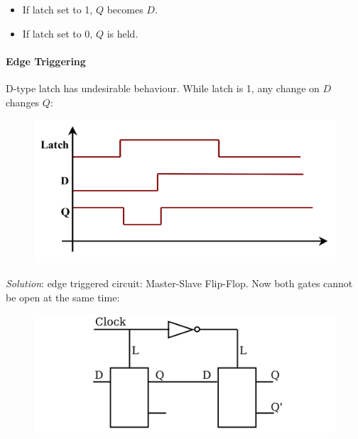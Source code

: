 \documentclass[twocolumn,english]{article}
\begin{document}
\begin{itemize}
\item If latch set to 1, $Q$ becomes $D$.
\item If latch set to 0, $Q$ is held.
\end{itemize}

\paragraph{Edge Triggering}

D-type latch has undesirable behaviour. While latch is 1, any change
on $D$ changes $Q$:

\begin{figure}[H]
\noindent \centering{}\includegraphics[width=0.2\paperwidth]{img/latch-td}
\end{figure}


\emph{Solution}: edge triggered circuit: Master-Slave Flip-Flop. Now
both gates cannot be open at the same time:

\begin{figure}[H]
\noindent \centering{}\includegraphics[width=0.2\paperwidth]{img/master-slave}
\end{figure}
\end{document}
